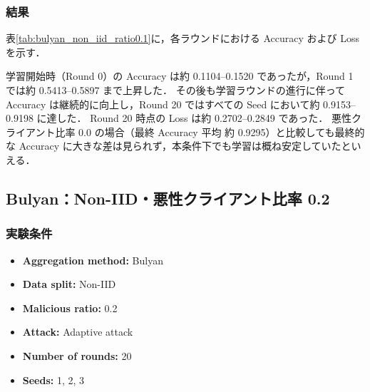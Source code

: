 \documentclass[a4j,twocolumn,dvipdfmx]{jsarticle}
\begin{document}
\subsubsection{結果}

表\ref{tab:bulyan_non_iid_ratio0.1}に，各ラウンドにおける
Accuracy および Loss を示す．

学習開始時（Round 0）の Accuracy は約 0.1104--0.1520 であったが，Round 1 では約 0.5413--0.5897 まで上昇した． その後も学習ラウンドの進行に伴って Accuracy は継続的に向上し，Round 20 ではすべての Seed において約 0.9153--0.9198 に達した． Round 20 時点の Loss は約 0.2702--0.2849 であった． 悪性クライアント比率 0.0 の場合（最終 Accuracy 平均 約 0.9295）と比較しても最終的な Accuracy に大きな差は見られず，本条件下でも学習は概ね安定していたといえる．

\clearpage
\subsection{Bulyan：Non-IID・悪性クライアント比率 0.2}

\subsubsection{実験条件}

\begin{itemize}
    \item \textbf{Aggregation method:} Bulyan
    \item \textbf{Data split:} Non-IID
    \item \textbf{Malicious ratio:} 0.2
    \item \textbf{Attack:} Adaptive attack
    \item \textbf{Number of rounds:} 20
    \item \textbf{Seeds:} 1, 2, 3
\end{itemize}

\end{document}
